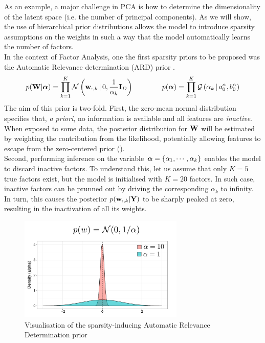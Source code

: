 As an example, a major challenge in PCA is how to determine the dimensionality of the latent space (i.e. the number of principal components). As we will show, the use of hierarchical prior distributions allows the model to introduce sparsity assumptions on the weights in such a way that the model automatically learns the number of factors.\\
In the context of Factor Analysis, one the first sparsity priors to be proposed was the Automatic Relevance determination (ARD) prior \cite{Neal1995,Mackay1996,Bishop1999a,Bishop1999b}. 
\begin{equation*} \label{eq:ard}
	p({\bf W}|\mbox{\boldmath $\alpha$}) = \prod_{k=1}^{K} \mathcal{N}\left({\bf w}_{:,k} \,|\, 0,\frac{1}{\alpha_{k}}{\bf I}_{D}\right) \\
	\qquad\qquad
	p(\mbox{\boldmath $\alpha$}) = \prod_{k=1}^{K} \mathcal{G}\left(\alpha_k \,|\, a_0^\alpha, b_0^\alpha\right)
\end{equation*}
The aim of this prior is two-fold. First, the zero-mean normal distribution specifies that, \textit{a priori}, no information is available and all features are \textit{inactive}. When exposed to some data, the posterior distribution for ${\bf W}$ will be estimated by weighting the contribution from the likelihood, potentially allowing features to escape from the zero-centered prior ().\\
Second, performing inference on the variable $\mbox{\boldmath $\alpha$} = \{ \alpha_1, \cdots, \alpha_k \}$ enables the model to discard inactive factors. To understand this, let us assume that only $K=5$ true factors exist, but the model is initialised with $K=20$ factors. In such case, inactive factors can be prunned out by driving the corresponding $\alpha_k$ to infinity. In turn, this causes the posterior $p({\bf w}_{:,k}|{\bf Y})$ to be sharply peaked at zero, resulting in the inactivation of all its weights. %

\begin{figure}[H] \begin{center}
	\includegraphics[width=0.7\textwidth]{Chapter2/Figs/ard}
	\caption{Visualisation of the sparsity-inducing Automatic Relevance Determination prior}
	\label{fig:ard}
\end{center} \end{figure}


